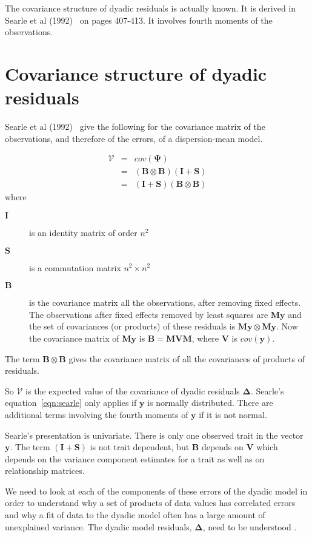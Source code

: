 \documentclass[titlepage,a4paper,12pt]{article}  %
\begin{document}
The covariance structure of dyadic residuals is actually known. It is derived in Searle et al (1992)~\cite{sear:92} on pages 407-413. It involves fourth moments of the observations.

\section{Covariance structure of dyadic residuals}
 Searle et al (1992)~\cite{sear:92} give the following for the covariance matrix of the observations, and therefore of the errors, of a dispersion-mean model.

\begin{eqnarray}
\label{eqn:searle}
 \bm{\mathcal{V}} & = & cov(\bm{\Psi})  \\
          & = & (\bm{B} \otimes \bm{B}) (\bm{I} + \bm{S}) \\
          & = & (\bm{I} + \bm{S}) (\bm{B} \otimes \bm{B})
\end{eqnarray}
where
\begin{description}
\item[$\bm{I}$] is an identity matrix of order $n^{2}$
\item[$\bm{S}$] is a commutation matrix $n^{2} \times n^{2}$
\item[$\bm{B}$] is the covariance matrix  all the observations, after removing fixed effects. The observations after fixed effects removed by least squares are $\bm{M}\bm{y}$  and the set of covariances (or products) of these residuals is $\bm{M}\bm{y} \otimes \bm{M}\bm{y}$. Now the covariance  matrix of $\bm{M}\bm{y}$ is  $\bm{B} = \bm{M}\bm{V}\bm{M}$, where $\bm{V}$ is $cov(\bm{y})$. 
\end{description}
The term $\bm{B} \otimes \bm{B}$ gives the covariance matrix of all the covariances of products of residuals. 

So $\bm{\mathcal{V}}$ is the expected value of the covariance of dyadic residuals $\bm{\Delta}$. Searle's equation~\ref{eqn:searle} only applies if $\bm{y}$ is normally distributed. There are additional terms involving the fourth moments of $\bm{y}$ if it is not normal.

Searle's presentation is univariate. There is only one observed trait in the vector $\bm{y}$. The term $(\bm{I} + \bm{S})$ is not trait dependent, but $\bm{B}$ depends on $\bm{V}$ which depends on the variance component estimates for a trait as well as on relationship matrices.

We need to look at each of the components of these errors of the dyadic model in order to understand why a set of products of data values has correlated errors and why a fit of data to the dyadic model often has a large amount of unexplained variance. The dyadic model residuals, $\bm{\Delta}$, need to be understood .
\end{document}
